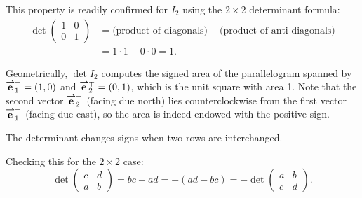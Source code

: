 \documentclass{ximera}
\begin{document}
This property is readily confirmed for $I_2$ using the $2 \times 2$
determinant formula:
\begin{align*}
  \det
  \begin{pmatrix}
    1 & 0 \\ 0 & 1
  \end{pmatrix}
  & = \text{(product of diagonals)} - \text{(product of
    anti-diagonals)} \\
  & = 1 \cdot 1 - 0 \cdot 0 = 1.
\end{align*}

Geometrically, $\det I_2$ computes the signed area of the
parallelogram spanned by ${\overset{\boldsymbol{\rightharpoonup}}{\mathbf{e}}}\hspace{0in}_1^\top = (1, 0)$ and
${\overset{\boldsymbol{\rightharpoonup}}{\mathbf{e}}}\hspace{0in}_2^\top = (0, 1)$, which is the unit square with area
1. Note that the second vector ${\overset{\boldsymbol{\rightharpoonup}}{\mathbf{e}}}\hspace{0in}_2^\top$ (facing due
north) lies counterclockwise from the first vector
${\overset{\boldsymbol{\rightharpoonup}}{\mathbf{e}}}\hspace{0in}_1^\top$ (facing due east), so the area is indeed
endowed with the positive sign.

\begin{image}[2in]
\end{image}



\begin{proposition}
  The determinant changes signs when two rows are interchanged.
\end{proposition}

Checking this for the $2 \times 2$ case:
\[
  \det
  \begin{pmatrix}
    c & d \\
    a & b
  \end{pmatrix}
  = bc - ad = -(ad - bc) =
  - \det
  \begin{pmatrix}
    a & b \\
    c & d
  \end{pmatrix}.
\]
\end{document}
